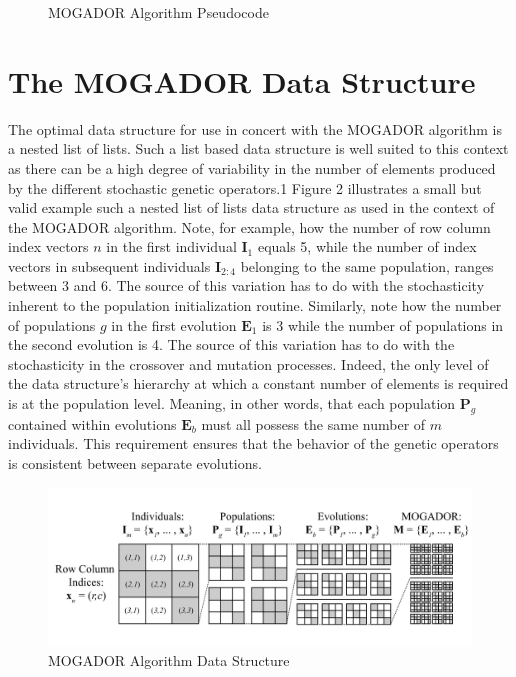             \begin{figure}[MOGADOR Algorithm Pseudocode]
            \caption[MOGADOR Algorithm Pseudocode]{MOGADOR Algorithm Pseudocode}
            \label{fig:mogador-pseudocode}
            \end{figure}
    
\section{The MOGADOR Data Structure}
    
The optimal data structure for use in concert with the MOGADOR algorithm is a nested list of lists. Such a list based data structure is well suited to this context as there can be a high degree of variability in the number of elements produced by the different stochastic genetic operators.1 Figure 2 illustrates a small but valid example such a nested list of lists data structure as used in the context of the MOGADOR algorithm. Note, for example, how the number of row column index vectors $n$ in the first individual $\textbf{I}_1$ equals 5, while the number of index vectors in subsequent individuals $\textbf{I}_{2:4}$ belonging to the same population, ranges between 3 and 6. The source of this variation has to do with the stochasticity inherent to the population initialization routine. Similarly, note how the number of populations $g$ in the first evolution $\textbf{E}_1$ is 3 while the number of populations in the second evolution is 4. The source of this variation has to do with the stochasticity in the crossover and mutation processes. Indeed, the only level of the data structure's hierarchy at which a constant number of elements is required is at the population level. Meaning, in other words, that each population $\textbf{P}_g$ contained within evolutions $\textbf{E}_b$ must all possess the same number of $m$ individuals. This requirement ensures that the behavior of the genetic operators is consistent between separate evolutions.
            
            \begin{figure}[MOGADOR Algorithm Data Structure]
            \centering
            \includegraphics[width=5.5in]{figures/data-structure.png}   
            \caption[MOGADOR Algorithm Data Structure]{MOGADOR Algorithm Data Structure}
            \label{fig:data-structure}
            \end{figure}

